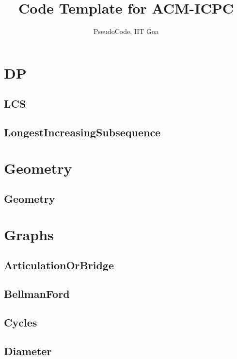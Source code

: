 \documentclass[a4paper, twocolumn]{article}
\title{Code Template for ACM-ICPC}
\author{PseudoCode, IIT Goa}
\begin{document}
\begin{titlepage}
\maketitle
\thispagestyle{empty}
\pagebreak
\pagestyle{fancy}
\lhead{}
\rhead{}
\cfoot{}
\tableofcontents
\end{titlepage}

\pagestyle{fancy}
\cfoot{- \thepage \ -}

\section{DP}
\subsection{LCS}

\subsection{LongestIncreasingSubsequence}

\section{Geometry}
\subsection{Geometry}

\section{Graphs}
\subsection{ArticulationOrBridge}

\subsection{BellmanFord}

\subsection{Cycles}

\subsection{Diameter}

\end{document}
